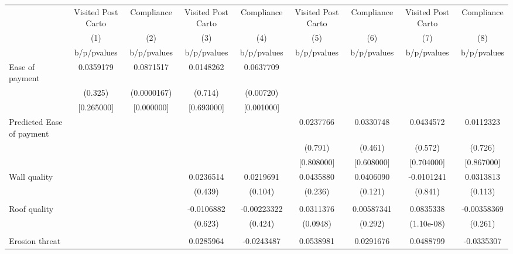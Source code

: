 {
\def\sym#1{\ifmmode^{#1}\else\(^{#1}\)\fi}
\begin{tabular}{l*{8}{c}}
\toprule
                &\multicolumn{1}{c}{Visited Post Carto}&\multicolumn{1}{c}{Compliance}&\multicolumn{1}{c}{Visited Post Carto}&\multicolumn{1}{c}{Compliance}&\multicolumn{1}{c}{Visited Post Carto}&\multicolumn{1}{c}{Compliance}&\multicolumn{1}{c}{Visited Post Carto}&\multicolumn{1}{c}{Compliance}\\
                &\multicolumn{1}{c}{(1)}&\multicolumn{1}{c}{(2)}&\multicolumn{1}{c}{(3)}&\multicolumn{1}{c}{(4)}&\multicolumn{1}{c}{(5)}&\multicolumn{1}{c}{(6)}&\multicolumn{1}{c}{(7)}&\multicolumn{1}{c}{(8)}\\
                &b/p/pvalues&b/p/pvalues&b/p/pvalues&b/p/pvalues&b/p/pvalues&b/p/pvalues&b/p/pvalues&b/p/pvalues\\
\midrule
Ease of payment &0.0359179&0.0871517&0.0148262&0.0637709&         &         &         &         \\
                &  (0.325)&(0.0000167)&  (0.714)&(0.00720)&         &         &         &         \\
                &[0.265000]&[0.000000]&[0.693000]&[0.001000]&         &         &         &         \\
Predicted Ease of payment&         &         &         &         &0.0237766&0.0330748&0.0434572&0.0112323\\
                &         &         &         &         &  (0.791)&  (0.461)&  (0.572)&  (0.726)\\
                &         &         &         &         &[0.808000]&[0.608000]&[0.704000]&[0.867000]\\
Wall quality    &         &         &0.0236514&0.0219691&0.0435880&0.0406090&-0.0101241&0.0313813\\
                &         &         &  (0.439)&  (0.104)&  (0.236)&  (0.121)&  (0.841)&  (0.113)\\
                &         &         &         &         &         &         &         &         \\
Roof quality    &         &         &-0.0106882&-0.00223322&0.0311376&0.00587341&0.0835338&-0.00358369\\
                &         &         &  (0.623)&  (0.424)& (0.0948)&  (0.292)&(1.10e-08)&  (0.261)\\
                &         &         &         &         &         &         &         &         \\
Erosion threat  &         &         &0.0285964&-0.0243487&0.0538981&0.0291676&0.0488799&-0.0335307\\

\end{tabular}}
